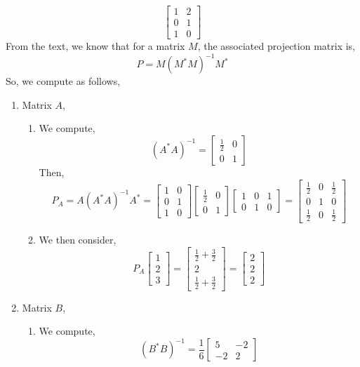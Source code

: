 \documentclass[letterpaper,10pt]{article}
\begin{document}
\begin{description}
\[\begin{bmatrix}
1 & 2\\0 & 1\\1 & 0
\end{bmatrix} \]
From the text, we know that for a matrix $M$, the associated projection matrix is,
\[P=M(M^*M)^{-1}M^*\]
So, we compute as follows,
\begin{enumerate}
\item Matrix $A$,
\begin{enumerate}
\item We compute,
\[(A^*A)^{-1}=\begin{bmatrix}
\frac{1}{2} & 0\\ 0 & 1
\end{bmatrix} \]
Then,
\[P_A=A(A^*A)^{-1}A^*=\begin{bmatrix}
1 & 0\\0 & 1\\1 & 0
\end{bmatrix}\begin{bmatrix}
\frac{1}{2} & 0\\ 0 & 1
\end{bmatrix}\begin{bmatrix}
1 & 0 & 1\\0 & 1 & 0
\end{bmatrix}=\begin{bmatrix}
\frac{1}{2} & 0 & \frac{1}{2}\\0 & 1 & 0\\\frac{1}{2} & 0 & \frac{1}{2}
\end{bmatrix} \]
\item We then consider,
\[P_A\begin{bmatrix}
1\\2\\3
\end{bmatrix}=\begin{bmatrix}
\frac{1}{2}+\frac{3}{2}\\2\\\frac{1}{2}+\frac{3}{2}
\end{bmatrix}=\begin{bmatrix}
2\\2\\2
\end{bmatrix} \]
\end{enumerate}
\item Matrix $B$,
\begin{enumerate}
\item We compute,
\[(B^*B)^{-1}=\frac{1}{6}\begin{bmatrix}
5 & -2\\-2 & 2

\end{bmatrix}\]
\end{enumerate}
\end{enumerate}
\end{description}
\end{document}
